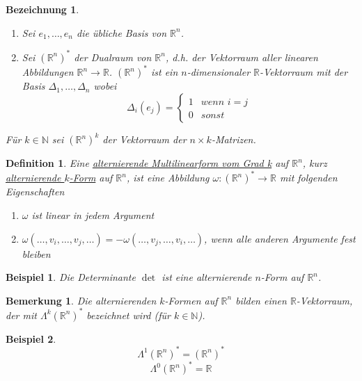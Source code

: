\documentclass[10pt,a4paper]{report}
\newtheorem*{defi}{Definition}
\newtheorem*{name}{Bezeichnung}
\newtheorem*{remark}{Bemerkung}
\newtheorem*{example}{Beispiel}
\begin{document}
\begin{name}
  \begin{enumerate}[label={\alph*)}]
  \item Sei $e_{1}, \dots, e_{n}$ die übliche Basis von $\mathbb{R}^{n}$.
  \item Sei $(\mathbb{R}^{n})^{*}$ der Dualraum von $\mathbb{R}^{n}$, d.h. der Vektorraum aller linearen Abbildungen $\mathbb{R}^{n} \rightarrow \mathbb{R}$.
    $(\mathbb{R}^{n})^{*}$ ist ein $n$-dimensionaler $\mathbb{R}$-Vektorraum mit der Basis $\Delta_{1}, \dots, \Delta_{n}$ wobei
    \begin{equation}
      \Delta_{i}(e_{j}) = \begin{cases}
        1 & \textit{wenn $i = j$}\\
        0 & \textit{sonst}
      \end{cases}
    \end{equation}
  \end{enumerate}
\item Für $k \in \mathbb{N}$ sei $(\mathbb{R}^{n})^{k}$ der Vektorraum der $n \times k$-Matrizen.
\end{name}

\begin{defi}
  Eine \underline{alternierende Multilinearform vom Grad k} auf $\mathbb{R}^{n}$, kurz \underline{alternierende $k$-Form} auf $\mathbb{R}^{n}$, ist eine Abbildung $\omega : (\mathbb{R}^{n})^{*} \rightarrow \mathbb{R}$ mit folgenden Eigenschaften
  \begin{enumerate}
  \item $\omega$ ist linear in jedem Argument
  \item $\omega(\dots, v_{i}, \dots, v_{j}, \dots) = -\omega(\dots, v_{j}, \dots, v_{i}, \dots)$, wenn alle anderen Argumente fest bleiben
  \end{enumerate}
\end{defi}

\begin{example}
  Die Determinante $\det$ ist eine alternierende $n$-Form auf $\mathbb{R}^{n}$.
\end{example}

\begin{remark}
  Die alternierenden $k$-Formen auf $\mathbb{R}^{n}$ bilden einen $\mathbb{R}$-Vektorraum, der mit $\Lambda^{k}(\mathbb{R}^{n})^{*}$ bezeichnet wird (für $k \in \mathbb{N}$).
\end{remark}

\begin{example}
  \begin{equation}
    \Lambda^{1}(\mathbb{R}^{n})^{*} = (\mathbb{R}^{n})^{*}
  \end{equation}
  \begin{equation}
    \Lambda^{0}(\mathbb{R}^{n})^{*} = \mathbb{R}
  \end{equation}
\end{example}
\end{document}

